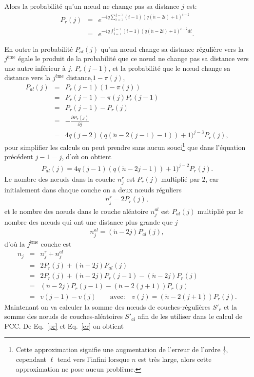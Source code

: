 Alors la probabilité qu'un nœud ne change pas sa distance $j$ est: 
\begin{eqnarray}
\label{pr}
P_r(j)&=& e^{-4q\sum_{i=1}^{j-1}(i-1)(q(\acute{n}-2i)+1)^{i-2}}\\\nonumber
&=&e^{-4q\int_{i=1}^{j-1}(i-1)(q(\acute{n}-2i)+1)^{i-2}di}.
\end{eqnarray}

En outre la probabilité $P_{al}(j)$ qu'un nœud change sa distance régulière vers la  $j^{\text{ème}}$ égale le produit de la probabilité que ce nœud ne change pas sa distance vers une autre inférieur à  $j$, $P_r(j-1)$, et la probabilité que le nœud change sa distance vers la $j^{\text{ème}}$ distance,$1-\pi(j)$,
\begin{eqnarray}\nonumber
P_{al}(j)&=&P_r(j-1)(1-\pi(j))\\\nonumber
&=&P_r(j-1)-\pi(j)P_r(j-1)\\\nonumber
&=&P_r(j-1)-P_r(j)\\\nonumber
&=&-\frac{\partial P_r(j)}{\partial j}\\
&=&4q(j-2)(q(\acute{n}-2(j-1)-1))+1)^{j-3}P_r(j),
\end{eqnarray}
pour simplifier les calculs on peut prendre sans aucun souci\footnote{Cette approximation signifie une augmentation de l'erreur de l'ordre $\frac{1}{\ell}$, cependant $\ell$ tend vers l'infini lorsque $n$ est très large, alors cette approximation ne pose aucun problème.} que dans l'équation précédent $j-1=j$, d'où on obtient
\begin{eqnarray}
P_{al}(j)=4q(j-1)(q(\acute{n}-2j-1))+1)^{j-2}P_r(j).
\label{pal}
\end{eqnarray}
Le nombre des nœuds dans la couche $n_{j}^r$ est $P_r(j)$ multiplié par $2$, car initialement dans chaque couche on a  deux nœuds réguliers
\begin{eqnarray}
n_{j}^r=2P_r(j),
\label{cr}
\end{eqnarray}
et le nombre des nœuds dans le couche aléatoire $n_{j}^{al}$ est $P_{al}(j)$ multiplié par le nombre des nœuds qui ont une distance plus grande que $j$
\begin{eqnarray}
n_{j}^{al}=(\acute{n}-2j)P_{al}(j),
\label{cal}
\end{eqnarray}
d'où la $j^{\text{ème}}$ couche est
\begin{eqnarray}
n_j&=&n_{j}^{r}+n_{j}^{al}\\\nonumber
&=&2P_r(j)+(\acute{n}-2j)P_{al}(j)\\\nonumber
&=&2P_r(j)+(\acute{n}-2j)P_r(j-1)-(\acute{n}-2j)P_r(j)\\\nonumber
&=&(\acute{n}-2j)P_r(j-1)-(\acute{n}-2(j+1))P_r(j)\\\nonumber
&=&v(j-1)-v(j) \quad \quad  \text{avec:} \quad v(j)=(\acute{n}-2(j+1))P_r(j).
\nonumber
\label{c}
\end{eqnarray}
Maintenant on va calculer la somme des nœuds de couches-régulières $S'_r$ et la somme des nœuds de couches-aléatoires $S'_{al}$ afin de les utiliser dans le calcul de PCC. De Eq.~\ref{pr} et Eq.~\ref{cr} on obtient

